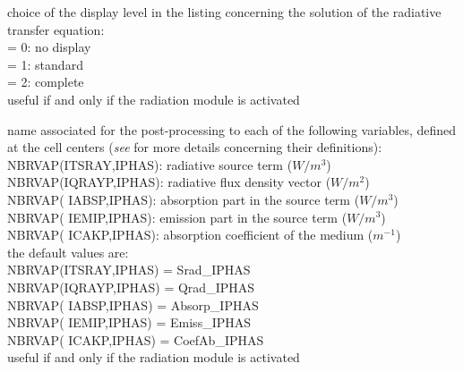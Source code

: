 {choice of the display level in the listing concerning the solution of
the radiative transfer equation:\\
\hspace*{1.3cm}= 0: no display\\
\hspace*{1.3cm}= 1: standard\\
\hspace*{1.3cm}= 2: complete\\
useful if and only if the radiation module is activated}

{name associated for the post-processing to each of the following variables,
defined at the cell centers ({\it see}
\cite{Douce02} for more details concerning their definitions):\\
\hspace*{1.3cm} NBRVAP(ITSRAY,IPHAS): radiative source term ($W/m^3$)\\
\hspace*{1.3cm} NBRVAP(IQRAYP,IPHAS): radiative flux density vector ($W/m^2$)\\
\hspace*{1.3cm} NBRVAP( IABSP,IPHAS): absorption part in the source term
($W/m^3$)\\
\hspace*{1.3cm} NBRVAP( IEMIP,IPHAS): emission part in the source term
($W/m^3$)\\
\hspace*{1.3cm} NBRVAP( ICAKP,IPHAS): absorption coefficient of the
medium ($m^{-1}$)\\
the default values are: \\
\hspace*{1.3cm} NBRVAP(ITSRAY,IPHAS) = Srad\_IPHAS \\
\hspace*{1.3cm} NBRVAP(IQRAYP,IPHAS) = Qrad\_IPHAS \\
\hspace*{1.3cm} NBRVAP( IABSP,IPHAS) = Absorp\_IPHAS \\
\hspace*{1.3cm} NBRVAP( IEMIP,IPHAS) = Emiss\_IPHAS \\
\hspace*{1.3cm} NBRVAP( ICAKP,IPHAS) = CoefAb\_IPHAS \\
useful if and only if the radiation module is activated}

